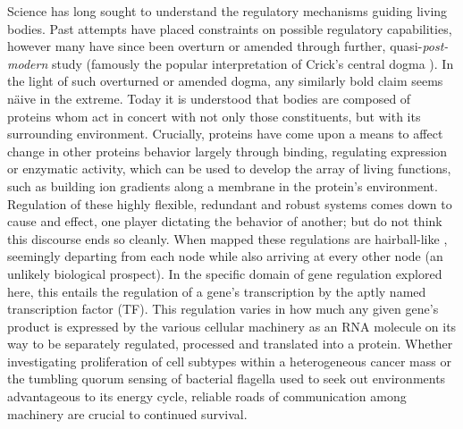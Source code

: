 Science has long sought to understand the regulatory mechanisms guiding living bodies. Past attempts have placed constraints on possible regulatory capabilities, however many have since been overturn or amended through further, quasi-\emph{post-modern} study (famously the popular interpretation of Crick's central dogma \cite{crick1958protein}). In the light of such overturned or amended dogma, any similarly bold claim seems n\"{a}ive in the extreme. Today it is understood that bodies are composed of proteins whom act in concert with not only those constituents, but with its surrounding environment. Crucially, proteins have come upon a means to affect change in other proteins behavior largely through binding, \eg regulating expression or enzymatic activity, which can be used to develop the array of living functions, such as building ion gradients along a membrane in the protein's environment. Regulation of these highly flexible, redundant and robust systems comes down to cause and effect, \ie one player dictating the behavior of another; but do not think this discourse ends so cleanly. When mapped these regulations are hairball-like \cite{schulz2013grooming}, seemingly departing from each node while also arriving at every other node (an unlikely biological prospect). In the specific domain of gene regulation explored here, this entails the regulation of a gene's transcription by the aptly named transcription factor (TF). This regulation varies in how much any given gene's product is expressed by the various cellular machinery as an RNA molecule on its way to be separately regulated, processed and translated into a protein. Whether investigating proliferation of cell subtypes within a heterogeneous cancer mass or the tumbling quorum sensing of bacterial flagella used to seek out environments advantageous to its energy cycle, reliable roads of communication among machinery are crucial to continued survival.

